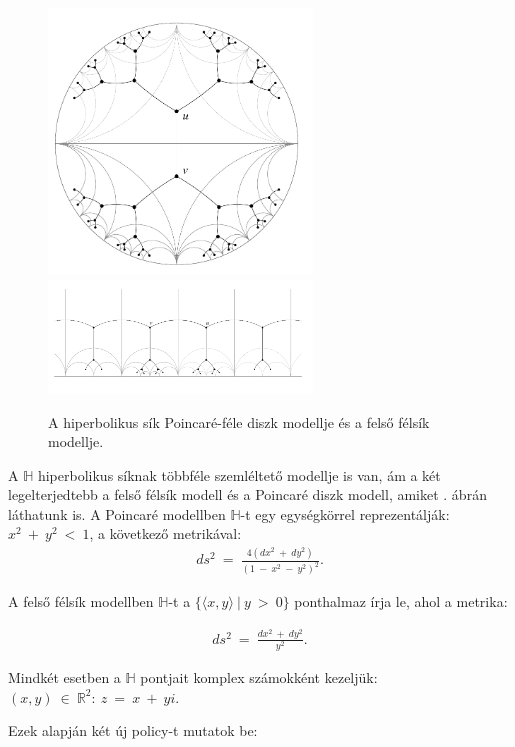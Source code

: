   \begin{figure}[h]
    \centering
    \includegraphics[width=70mm]{./figures/3-reg_disk.png}\hspace{5mm}
    \includegraphics[width=70mm,keepaspectratio=true]{./figures/3-reg_half_plane.png}
    \caption{A hiperbolikus sík Poincaré-féle diszk modellje és a felső félsík modellje\cite{Klein07}.}
    \label{fig:figure_hiperbolikusabrak}
  \end{figure}

  A $\mathbb{H}$ hiperbolikus síknak többféle szemléltető modellje is van, ám a két legelterjedtebb a felső félsík modell és a Poincaré diszk modell, amiket . ábrán láthatunk is. A Poincaré modellben $\mathbb{H}$-t egy egységkörrel reprezentálják: $x^2~+~y^2~<~1$, a következő metrikával:
  \begin{align}
    ds^2~=~\frac{4(dx^2~+~dy^2)}{(1~-~x^2~-~y^2)^2}.
  \end{align}

  A felső félsík modellben $\mathbb{H}$-t a $\{\langle x,y\rangle ~|~y~>~0\}$ ponthalmaz írja le, ahol a metrika:

  \begin{align}
    ds^2~=~\frac{dx^2~+~dy^2}{y^2}.
  \end{align}

  Mindkét esetben a $\mathbb{H}$ pontjait komplex számokként kezeljük: $(x,y)~\in~\mathbb{R}^2:~z~=~x~+~yi$.

  Ezek alapján két új policy-t mutatok be:

